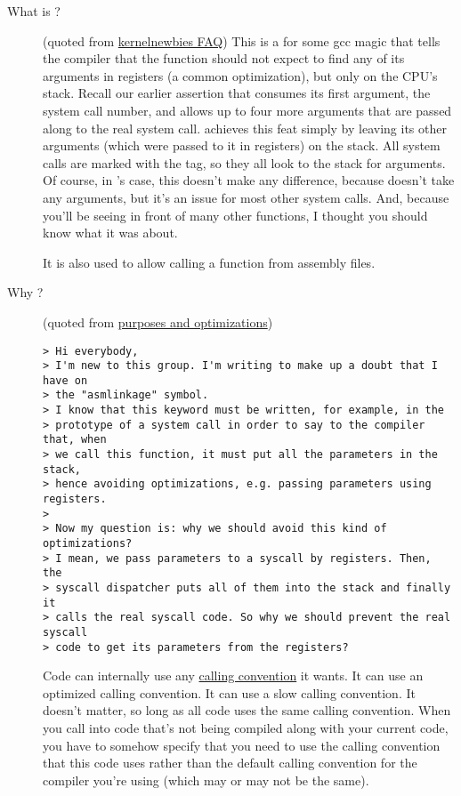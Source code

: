 \begin{description}
\item[What is ?] (quoted from
  \href{http://kernelnewbies.org/FAQ/asmlinkage}{kernelnewbies FAQ}) This is a
   for some gcc magic that tells the compiler that the function should not
  expect to find any of its arguments in registers (a common optimization), but only on
  the CPU's stack. Recall our earlier assertion that  consumes its
  first argument, the system call number, and allows up to four more arguments that are
  passed along to the real system call.  achieves this feat simply by
  leaving its other arguments (which were passed to it in registers) on the stack. All
  system calls are marked with the  tag, so they all look to the stack for
  arguments. Of course, in 's case, this doesn't make any
  difference, because  doesn't take any arguments, but it's an
  issue for most other system calls. And, because you'll be seeing  in front of
  many other functions, I thought you should know what it was about.

  It is also used to allow calling a function from assembly files.
\item[Why ?] (quoted from \href{http://forum.soft32.com/linux/asmlinkage-purposes-optimizations-ftopict516190.html}{ purposes and optimizations})
\begin{verbatim}
> Hi everybody, 
> I'm new to this group. I'm writing to make up a doubt that I have on 
> the "asmlinkage" symbol. 
> I know that this keyword must be written, for example, in the 
> prototype of a system call in order to say to the compiler that, when 
> we call this function, it must put all the parameters in the stack, 
> hence avoiding optimizations, e.g. passing parameters using registers. 
> 
> Now my question is: why we should avoid this kind of optimizations? 
> I mean, we pass parameters to a syscall by registers. Then, the 
> syscall dispatcher puts all of them into the stack and finally it 
> calls the real syscall code. So why we should prevent the real syscall 
> code to get its parameters from the registers? 
\end{verbatim}
  Code can internally use any
  \href{http://en.wikipedia.org/wiki/Calling_convention}{calling convention} it wants. It
  can use an optimized calling convention. It can use a slow calling convention. It
  doesn't matter, so long as all code uses the same calling convention.  When you call
  into code that's not being compiled along with your current code, you have to somehow
  specify that you need to use the calling convention that this code uses rather than the
  default calling convention for the compiler you're using (which may or may not be the
  same).


\end{description}
